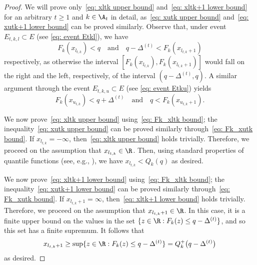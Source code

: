 \begin{proof}
We will prove only~\eqref{eq: xltk upper bound} and~\eqref{eq: xltk+1 lower bound}
for an arbitrary $t  \ge 1$ and  $k \in \A_t$
in detail, as~\eqref{eq: xutk upper bound} and~\eqref{eq: xutk+1 lower bound} can be proved similarly.
Observe that, under event $E_{t,k,l} \subset E$ (see \eqref{eq: event Etkl}), we have 
\begin{equation}
\label{eq: Fk_xltk bound}
    F_k(x_{l_{t, k}}) < q
    \quad \text{and} \quad
    q -  \Delta^{(t)} < F_k(x_{l_{t, k}+1})
\end{equation}
respectively,
as otherwise the interval $[F_k(x_{l_{t, k}}), F_k(x_{l_{t, k}+1})]$
would fall on the right and the left, respectively, of the interval $\left( q - \Delta^{(t)}, q   \right)$. A similar argument through the event $E_{t,k,u} \subset E$ (see \eqref{eq: event Etku}) yields
\begin{equation}
\label{eq: Fk_xutk bound}
    F_k(x_{u_{t, k}}) < q + \Delta^{(t)}
    \quad \text{and} \quad
    q  < F_k(x_{u_{t, k}+1}).
\end{equation}

We now prove~\eqref{eq: xltk upper bound} using~\eqref{eq: Fk_xltk bound}; the inequality~\eqref{eq: xutk upper bound} can be proved similarly through~\eqref{eq: Fk_xutk bound}. If $x_{l_{t, k}} = - \infty$, then~\eqref{eq: xltk upper bound} holds trivially.
Therefore, we proceed on the assumption that $x_{l_{t, k}} \in \R$.
Then, using standard properties of quantile functions (see, e.g., \cite[4.3 Theorem]{dufour1995distribution}), we have $x_{l_{t, k}} < Q_k(q)$ as desired.

We now prove~\eqref{eq: xltk+1 lower bound} using~\eqref{eq: Fk_xltk bound}; the inequality~\eqref{eq: xutk+1 lower bound} can be proved similarly through~\eqref{eq: Fk_xutk bound}. 
If $x_{l_{t, k}+1} = \infty$, then~\eqref{eq: xltk+1 lower bound} holds trivially.
Therefore, we proceed on the assumption that $x_{l_{t, k}+1} \in \R$.
In this case, it is a finite upper bound on the values in the set
    $\{ z \in \R: F_k(z) \le q -  \Delta^{(t)}  \}$, and so this set has a finite supremum. It follows that 
    \begin{equation}
        x_{l_{t, k}+1} \ge 
        \sup \{ z \in \R : F_k(z) \le q -  \Delta^{(t)}  \} =
        Q^+_k\big( q -  \Delta^{(t)} \big)
    \end{equation}
    as desired.
\end{proof}


